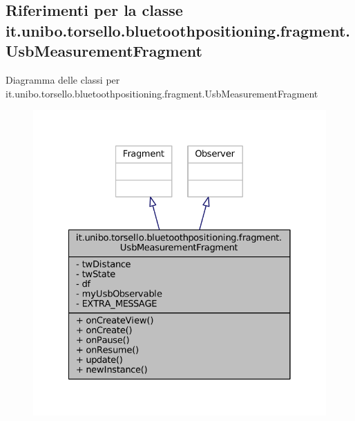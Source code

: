 \hypertarget{classit_1_1unibo_1_1torsello_1_1bluetoothpositioning_1_1fragment_1_1UsbMeasurementFragment}{}\subsection{Riferimenti per la classe it.\+unibo.\+torsello.\+bluetoothpositioning.\+fragment.\+Usb\+Measurement\+Fragment}
\label{classit_1_1unibo_1_1torsello_1_1bluetoothpositioning_1_1fragment_1_1UsbMeasurementFragment}


Diagramma delle classi per it.\+unibo.\+torsello.\+bluetoothpositioning.\+fragment.\+Usb\+Measurement\+Fragment
\nopagebreak
\begin{figure}[H]
\begin{center}
\leavevmode
\includegraphics[width=328pt]{classit_1_1unibo_1_1torsello_1_1bluetoothpositioning_1_1fragment_1_1UsbMeasurementFragment__inherit__graph}
\end{center}
\end{figure}


